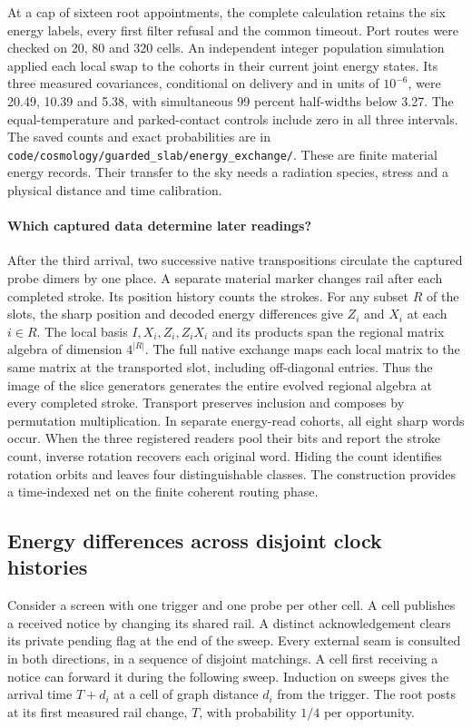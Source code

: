 \documentclass[11pt]{article}
\theoremstyle{remark}
\begin{document}
At a cap of sixteen root appointments, the complete calculation retains
the six energy labels, every first filter refusal and the common timeout.
Port routes were checked on 20, 80 and 320 cells. An independent integer
population simulation applied each local swap to the cohorts in their
current joint energy states. Its three measured covariances, conditional
on delivery and in units of \(10^{-6}\), were 20.49, 10.39 and 5.38, with
simultaneous 99 percent half-widths below 3.27. The equal-temperature and
parked-contact controls include zero in all three intervals.
The saved counts and exact probabilities are in
\nolinkurl{code/cosmology/guarded_slab/energy_exchange/}.
These are finite material energy records. Their transfer to the sky needs
a radiation species, stress and a physical distance and time calibration.

\paragraph{Which captured data determine later readings?}
After the third arrival, two successive native transpositions circulate
the captured probe dimers by one place. A separate material marker changes
rail after each completed stroke. Its position history counts the strokes.
For any subset \(R\) of the slots, the sharp position and decoded energy
differences give \(Z_i\) and \(X_i\) at each \(i\in R\).
The local basis \(I,X_i,Z_i,Z_iX_i\) and its products span the regional
matrix algebra of dimension \(4^{|R|}\). The full native exchange maps
each local matrix to the same matrix at the transported slot, including
off-diagonal entries. Thus the image of the slice generators generates
the entire evolved regional algebra at every completed stroke. Transport
preserves inclusion and composes by permutation multiplication.
In separate energy-read cohorts, all eight sharp words occur. When the
three registered readers pool their bits and report the stroke count,
inverse rotation recovers each original word. Hiding the count identifies
rotation orbits and leaves four distinguishable classes. The construction
provides a time-indexed net on the finite coherent routing phase.

\subsection{Energy differences across disjoint clock histories}

Consider a screen with one trigger and one probe per other cell. A cell
publishes a received notice by changing its shared rail. A distinct
acknowledgement clears its private pending flag at the end of the sweep.
Every external seam is consulted in both directions, in a sequence of
disjoint matchings. A cell first receiving a notice can forward it during
the following sweep. Induction on sweeps gives the arrival time \(T+d_i\)
at a cell of graph distance \(d_i\) from the trigger. The root posts at its
first measured rail change, \(T\), with probability \(1/4\) per opportunity.
\end{document}
